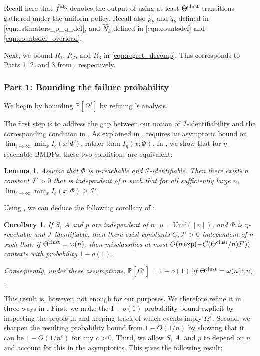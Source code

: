 \documentclass[11pt]{article}
\newcommand{\mcI}{\mathcal{I}}
\newcommand{\mbbP}{\mathbb{P}}
\newcommand{\clust}{\textnormal{clust}}
\newcommand{\alg}{\textnormal{alg}}
\newtheorem{corollary}[theorem]{Corollary}
\newtheorem{lemma}[theorem]{Lemma}
\theoremstyle{definition}
\theoremstyle{definition}
\begin{document}
Recall here that $\hat{f}^{\alg}$ denotes the output of  using at least $\Theta^{\clust}$ transitions gathered under the uniform policy.
Recall also $\hat{p}_k$ and $\hat{q}_k$ defined in \eqref{eqn:estimators_p_q_def}, and $\hat{N}_k$ defined in \eqref{eqn:countsdef} and \eqref{eqn:countsdef_overload}.

Next, we bound $R_1$, $R_2$, and $R_3$ in \eqref{eqn:regret_decomp}.
This corresponds to Parts 1, 2, and 3 from , respectively.

\subsubsection*{Part 1: Bounding the failure probability}

We begin by bounding $\mbbP[\Omega^f]$ by refining \cite{Jedra:2022}'s analysis.

The first step is to address the gap between our notion of $\mcI$-identifiability and the corresponding condition in \cite{Jedra:2022}.
As explained in , \cite{Jedra:2022} requires an asymptotic bound on $\lim_{\zeta\rightarrow\infty}\min_x I_{\zeta}(x;\Phi)$, rather than $I_{\eta}(x;\Phi)$.
In , we show that for $\eta$-reachable \glspl{BMDP}, these two conditions are equivalent:
\begin{lemma}
	\label{lem:equivalence-of-assumptions}
	Assume that $\Phi$ is $\eta$-reachable and $\mcI$-identifiable.
	Then there exists a constant $\mcI'>0$ that is independent of $n$ such that for all sufficiently large $n$, $\lim_{\zeta\rightarrow\infty}\min_{x}I_{\zeta}(x;\Phi)\geq \mcI'$.
\end{lemma}

Using , we can deduce the following corollary of \cite[Theorem 3]{Jedra:2022}:
\begin{corollary}
	If $S$, $A$ and $p$ are independent of $n$, $\mu=\mathrm{Unif}([n])$, and $\Phi$  is $\eta$-reachable and $\mcI$-identifiable, then there exist constants $C,\mcI'>0$ independent of $n$ such that: if $\Theta^{\clust}=\omega(n)$, then  misclassifies at most $O(n\exp(-C (\Theta^{\clust}/n)\mcI'))$ contexts with probability $1-o(1)$.
	
	Consequently, under these assumptions, $\mbbP[\Omega^f]=1-o(1)$ if $\Theta^{\clust}=\omega(n\ln n)$.
\end{corollary}
This result is, however, not enough for our purposes.
We therefore refine it in three ways in .
First, we make the $1-o(1)$ probability bound explicit by inspecting the proofs in \cite{Jedra:2022} and keeping track of which events imply $\Omega^f$.
Second, we sharpen the resulting probability bound from $1-O(1/n)$ by showing that it can be $1-O(1/n^c)$ for any $c>0$.
Third, we allow $S$, $A$, and $p$ to depend on $n$ and account for this in the asymptotics.
This gives the following result:
\end{document}
